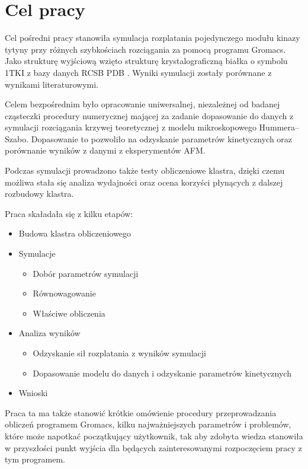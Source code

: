 \chapter{Cel pracy}
Cel pośredni pracy stanowiła symulacja rozplatania pojedynczego modułu kinazy tytyny przy różnych szybkościach rozciągania za pomocą programu Gromacs. Jako strukturę wyjściową wzięto strukturę krystalograficzną białka o symbolu 1TKI z bazy danych RCSB PDB \cite{pdbdb}. Wyniki symulacji zostały porównane z wynikami literaturowymi. 

Celem bezpośrednim było opracowanie uniwersalnej, niezależnej od badanej cząsteczki procedury numerycznej mającej za zadanie dopasowanie do danych z symulacji rozciągania krzywej teoretycznej z modelu mikroskopowego Hummera--Szabo\cite{Hummer_Szabo_2003}. Dopasowanie to pozwoliło na odzyskanie parametrów kinetycznych oraz porównanie wyników z danymi z eksperymentów AFM.

Podczas symulacji prowadzono także testy obliczeniowe klastra, dzięki czemu możliwa stała się analiza wydajności oraz ocena korzyści płynących z dalszej rozbudowy klastra.

Praca skaładała się z kilku etapów:
\begin{itemize}
\item Budowa klastra obliczeniowego
\item Symulacje
\begin{itemize}
\item Dobór parametrów symulacji
\item Równowagowanie
\item Właściwe obliczenia
\end{itemize}
\item Analiza wyników
\begin{itemize}
\item Odzyskanie sił rozplatania z wyników symulacji
\item Dopasowanie modelu do danych i odzyskanie parametrów kinetycznych
\end{itemize}
\item Wnioski
\end{itemize}

Praca ta ma także stanowić krótkie omówienie procedury przeprowadzania obliczeń programem Gromacs, kilku najważniejszych parametrów i problemów, które może napotkać początkujący użytkownik, tak aby zdobyta wiedza stanowiła w przyszłości punkt wyjścia dla będących zainteresowanymi rozpoczęciem pracy z tym programem.